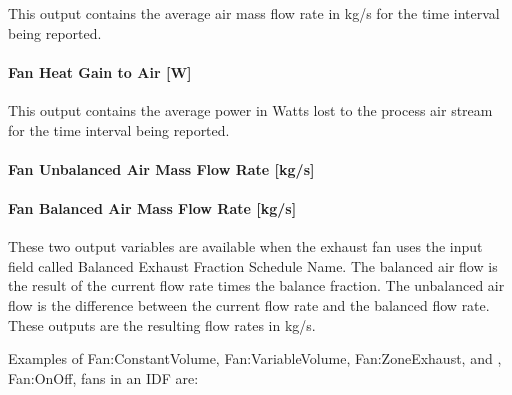 This output contains the average air mass flow rate in kg/s for the time interval being reported.

\paragraph{Fan Heat Gain to Air {[}W{]}}\label{fan-heat-gain-to-air-w-3}

This output contains the average power in Watts lost to the process air stream for the time interval being reported.

\paragraph{Fan Unbalanced Air Mass Flow Rate {[}kg/s{]}}\label{fan-unbalanced-air-mass-flow-rate-kgs}

\paragraph{Fan Balanced Air Mass Flow Rate {[}kg/s{]}}\label{fan-balanced-air-mass-flow-rate-kgs}

These two output variables are available when the exhaust fan uses the input field called Balanced Exhaust Fraction Schedule Name. The balanced air flow is the result of the current flow rate times the balance fraction. The unbalanced air flow is the difference between the current flow rate and the balanced flow rate. These outputs are the resulting flow rates in kg/s.

Examples of Fan:ConstantVolume, Fan:VariableVolume, Fan:ZoneExhaust, and , Fan:OnOff, fans in an IDF are:

